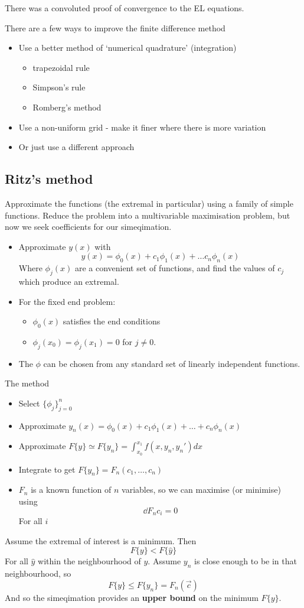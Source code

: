 \documentclass{X:/Documents/Coding/Latex/myassignment}
\begin{document}
There was a convoluted proof of convergence to the EL equations.

There are a few ways to improve the finite difference method
\begin{itemize}
 	\item Use a better method of `numerical quadrature' (integration)
 	\begin{itemize}
 		\item trapezoidal rule
 		\item Simpson's rule
 		\item Romberg's method
 	\end{itemize}
 	\item Use a non-uniform grid - make it finer where there is more variation
 	\item Or just use a different approach
 \end{itemize} 

\subsection{Ritz's method}
Approximate the functions (the extremal in particular) using a family of simple functions. Reduce the problem into a multivariable maximisation problem, but now we seek coefficients for our simeqimation.

\begin{itemize}
	\item Approximate $y(x)$ with
	\[y(x) = \phi_0(x) + c_1 \phi_1(x) + \ldots c_n \phi_n(x)\]
	Where $\phi_j(x)$ are a convenient set of functions, and find the values of $c_j$ which produce an extremal.
	\item For the fixed end problem:
	\begin{itemize}
		\item $\phi_0(x)$ satisfies the end conditions
		\item $\phi_j(x_0) = \phi_j(x_1) = 0$ for $j\neq 0$.
	\end{itemize}
	\item The $\phi$ can be chosen from any standard set of linearly independent functions.
\end{itemize}

The method 
\begin{itemize}
	\item Select $\{\phi_j\}_{j=0}^n$
	\item Approximate $y_n(x) = \phi_0(x) + c_1 \phi_1(x) + \ldots + c_n\phi_n(x)$
	\item Approximate $F\{y\} \simeq F\{y_n\} = \int_{x_0}^{x_1} f(x,y_n,y_n') dx$
	\item Integrate to get $F\{y_n\} = F_n(c_1,\ldots,c_n)$
	\item $F_n$ is a known function of $n$ variables, so we can maximise (or minimise) using 
	\[\dd{F_n}{c_i} = 0\]
	For all $i$
\end{itemize}
Assume the extremal of interest is a minimum. Then 
\[F\{y\} < F\{\hat{y}\}\]
For all $\hat{y}$ within the neighbourhood of $y$. Assume $y_n$ is close enough to be in that neighbourhood, so
\[F\{y\} \leq F\{y_n\} = F_n(\vec c)\]
And so the simeqimation provides an \textbf{upper bound} on the minimum $F\{y\}$.
\end{document}
